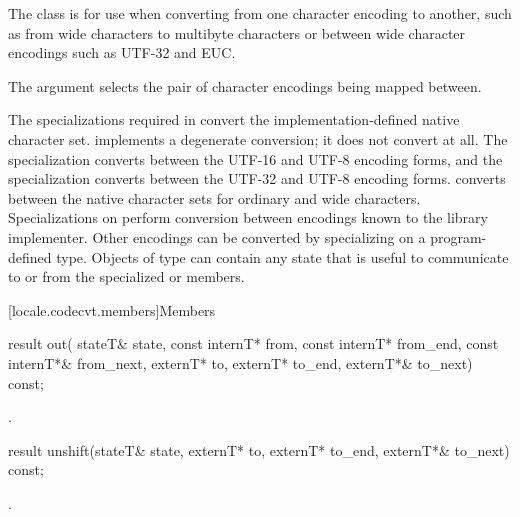 \pnum
The class
is for use when
converting from one character encoding to another, such as from wide characters
to multibyte characters or between wide character encodings such as
UTF-32 and EUC.

\pnum
The
argument selects the pair of character encodings being mapped between.

\pnum
The specializations required in 
convert the implementation-defined native character set.
implements a degenerate conversion;
it does not convert at all.
The specialization 
converts between the UTF-16 and UTF-8 encoding forms, and
the specialization  
converts between the UTF-32 and UTF-8 encoding forms.
converts between the native character sets for ordinary and wide characters.
Specializations on
perform conversion between encodings known to the library implementer.
Other encodings can be converted by specializing on a program-defined
type.
Objects of type
can contain any state that is useful to communicate to or from
the specialized
or
members.

[locale.codecvt.members]{Members}

%
\begin{itemdecl}
result out(
    stateT& state,
    const internT* from, const internT* from_end, const internT*& from_next,
    externT* to, externT* to_end, externT*& to_next) const;
\end{itemdecl}

\begin{itemdescr}
\pnum
\returns
{}.
\end{itemdescr}

%
\begin{itemdecl}
result unshift(stateT& state, externT* to, externT* to_end, externT*& to_next) const;
\end{itemdecl}

\begin{itemdescr}
\pnum
\returns
{}.
\end{itemdescr}

